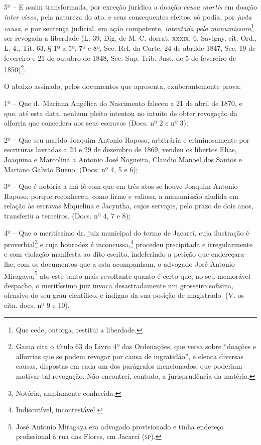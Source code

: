 {\begin{flushright}
5º -- E assim transformada, por exceção jurídica a doação \emph{causa
mortis} em doação \emph{inter vivos}, pela natureza do ato, e seus
consequentes efeitos, só podia, por \emph{justa causa}, e por sentença
judicial, em ação competente, \emph{intentada pela
manumissora}\footnote{ Que cede, outorga, restitui a liberdade.} ser
revogada a liberdade (L. 39, Dig. de M. C. dorrat. \textsc{xxxix}, 6, Savigny,
cit. Ord., L. 4., Tít. 63, § 1º a 5º, 7º e 8º, Sec. Rel. da Corte, 24 de
abrilde 1847, Sec. 19 de fevereiro e 21 de outubro de 1848, Sec. Sup.
Trib. Just. de 5 de fevereiro de 1850)\footnote{ Gama cita o título 63
  do Livro 4º das Ordenações, que versa sobre ``doações e alforrias
  que se podem revogar por causa de ingratidão'', e elenca diversas
  causas, dispostas em cada um dos parágrafos mencionados, que poderiam
  motivar tal revogação. Não encontrei, contudo, a jurisprudência da
  matéria.}.

O abaixo assinado, pelos documentos que apresenta, exuberantemente
prova:

1º -- Que d.~Mariana Angélica do Nascimento faleceu a 21 de abril de
1870, e que, até esta data, nenhum pleito intentou no intuito de obter
revogação da alforria que concedera aos seus escravos (Docs. nº 2 e nº
3);

2º -- Que seu marido Joaquim Antonio Raposo, arbitrária e criminosamente
por escrituras lavradas a 24 e 29 de dezembro de 1869, vendeu os
libertos Elias, Joaquina e Marcolina a Antonio José Nogueira, Claudio
Manoel dos Santos e Mariano Galvão Bueno. (Docs: nº 4, 5 e 6);

3º -- Que é notória a má fé com que em três atos se houve Joaquim
Antonio Raposo, porque reconheceu, como firme e valiosa, a manumissão
aludida em relação às escravas Miquelina e Jacyntha, cujos serviços,
pelo prazo de dois anos, transferiu a terceiros. (Docs. nº 4, 7 e 8);

4º -- Que o meritíssimo dr. juiz municipal do termo de Jacareí, cuja
ilustração é proverbial\footnote{ Notória, amplamente conhecida.} e
cuja honradez é inconcussa,\footnote{ Indiscutível, incontestável.}
procedeu precipitada e irregularmente e com violação manifesta ao dito
escrito, indeferindo a petição que endereçara-lhe, com os documentos que
a esta acompanham, o advogado José Antonio Miragaya;\footnote{ José
  Antonio Miragaya era advogado provisionado e tinha endereço
  profissional à rua das Flores, em Jacareí (\textsc{sp}).} ato este tanto mais
revoltante quanto é certo que, no seu memorável despacho, o meritíssimo
juiz invoca desastradamente um grosseiro sofisma, ofensivo do seu grau
científico, e indigno da sua posição de magistrado. (V. os cita. docs.
nº 9 e 10).


\end{flushright}}
